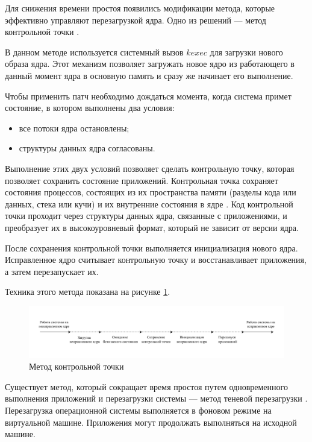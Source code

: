 Для снижения времени простоя появились модификации метода, которые эффективно управляют перезагрузкой ядра. Одно из решений --- метод контрольной точки \cite{kup}.

В данном методе используется системный вызов $kexec$  \cite{seamless} для загрузки нового образа ядра. Этот механизм позволяет загружать новое ядро из работающего в данный момент ядра в основную память и сразу же начинает его выполнение.

Чтобы применить патч необходимо дождаться момента, когда система примет состояние, в котором выполнены два условия:
\begin{itemize}
	\item все потоки ядра остановлены;
	\item структуры данных ядра согласованы.
\end{itemize}

Выполнение этих двух условий позволяет сделать контрольную точку, которая позволяет сохранить состояние приложений. Контрольная точка сохраняет состояния процессов, состоящих из их пространства памяти (разделы кода или данных, стека или кучи)
и их внутренние состояния в ядре \cite{checkpoint}. Код контрольной точки проходит через структуры данных ядра, связанные с приложениями, и преобразует их в высокоуровневый формат, который не зависит от версии ядра. 

После сохранения контрольной точки выполняется инициализация нового ядра. Исправленное ядро считывает контрольную точку и восстанавливает приложения, а затем перезапускает их.

Техника этого метода показана на рисунке \ref{img:checkpoint}.

\begin{figure}[H]
	\begin{center}
		\includegraphics[scale=0.7]{img/checkpoint.pdf}
	\end{center}
	\captionsetup{justification=centering}
	\caption{Метод контрольной точки}
	\label{img:checkpoint}
\end{figure}

Существует метод, который сокращает время простоя путем одновременного выполнения приложений и перезагрузки системы --- метод теневой перезагрузки \cite{shadow}. Перезагрузка операционной системы выполняется в фоновом режиме на виртуальной машине. Приложения могут продолжать выполняться на исходной машине.

